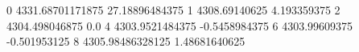 0 4331.68701171875 27.18896484375
1 4308.69140625 4.193359375
2 4304.498046875 0.0
4 4303.9521484375 -0.5458984375
6 4303.99609375 -0.501953125
8 4305.98486328125 1.48681640625
